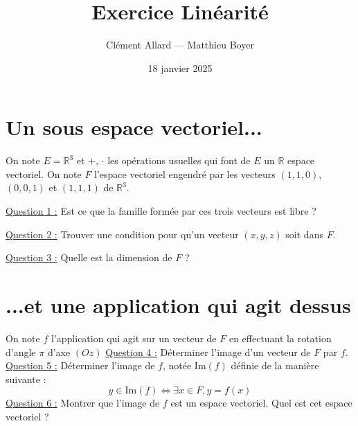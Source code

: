 \documentclass{classe}
\title{Exercice Linéarité}
\author{Clément Allard --- Matthieu Boyer}
\date{18 janvier 2025}
\renewcommand{\question}[1]{\underline{Question #1 :}}
\begin{document}
\section{Un sous espace vectoriel...}

On note $E = \mathbb{R}^3$ et $+$, $\cdot$ les opérations usuelles qui font de $E$ un $\mathbb{R}$ espace vectoriel. On note $F$ l'espace vectoriel engendré par les vecteurs $(1, 1, 0)$, $(0, 0, 1)$ et $(1, 1, 1)$ de $\mathbb{R}^3$.

\medskip

\question{1} Est ce que la famille formée par ces trois vecteurs est libre ?

\medskip

\question{2} Trouver une condition pour qu'un vecteur $(x, y, z)$ soit dans $F$.

\medskip

\question{3} Quelle est la dimension de $F$ ?

\section{...et une application qui agit dessus}

On note $f$ l'application qui agit sur un vecteur de $F$ en effectuant la rotation d'angle $\pi$ d'axe $(Oz)$
\newline
\newline
\question{4} Déterminer l'image d'un vecteur de $F$ par $f$.
\newline
\newline
\question{5} Déterminer l'image de $f$, notée $\mathrm{Im}(f)$ définie de la manière suivante :
\begin{equation*}
y\in \mathrm{Im}(f) \iff \exists x \in F, y=f(x)
\end{equation*}
\question{6} Montrer que l'image de $f$ est un espace vectoriel. Quel est cet espace vectoriel ?
\end{document}
